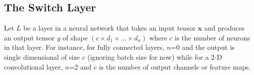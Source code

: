  


\subsection{The Switch Layer}

Let $L$ be a layer in a neural network that takes an input tensor $\bm{x}$ and
produces an output tensor $y$ of shape $\left(c \times d_1 \times \dots \times
d_n\right)$ where $c$ is the number of neurons in that layer.  For instance, for
fully connected layers, $n$=0 and the output is single dimensional of size $c$
(ignoring batch size for now) while for a 2-D convolutional layer, $n$=2 and $c$
is the number of output channels or feature maps.


